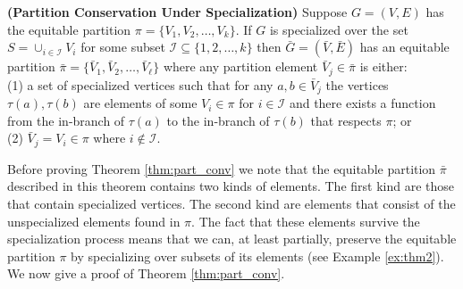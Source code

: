 \documentclass[12pt]{thesis}
\begin{document}
\begin{theorem}{\textbf{(Partition Conservation Under Specialization)}}\label{thm:part_conv}
Suppose $G=(V,E)$ has the equitable partition $\pi=\{V_1,V_2,\dots,V_k\}$.
If $G$ is specialized over the set $S=\cup_{i\in\mathcal{I}}V_i$ for some subset $\mathcal{I}\subseteq\{1,2,\dots,k\}$ then $\bar{G}=(\bar{V},\bar{E})$ has an equitable partition $\bar{\pi}=\{\bar{V}_1,\bar{V}_2,\dots,\bar{V}_\ell\}$ where any partition element $\bar{V}_j\in\bar{\pi}$ is either:\\
(1) a set of specialized vertices such that for any $a,b\in \bar{V}_j$ the vertices $\tau(a),\tau(b)$ are elements of some $V_{i}\in\pi$ for $i\in\mathcal{I}$ and there exists a function from the in-branch of $\tau(a)$ to the in-branch of $\tau(b)$ that respects $\pi$; or\\
(2) $\bar{V}_j=V_i\in\pi$ where $i\notin\mathcal{I}$.
\end{theorem}

Before proving Theorem \ref{thm:part_conv} we note that the equitable partition $\bar{\pi}$ described in this theorem contains two kinds of elements.
The first kind are those that contain specialized vertices.
The second kind are elements that consist of the unspecialized elements found in $\pi$.
The fact that these elements survive the specialization process means that we can, at least partially, preserve the equitable partition $\pi$ by specializing over subsets of its elements (see Example \ref{ex:thm2}).
We now give a proof of Theorem \ref{thm:part_conv}.
\end{document}
